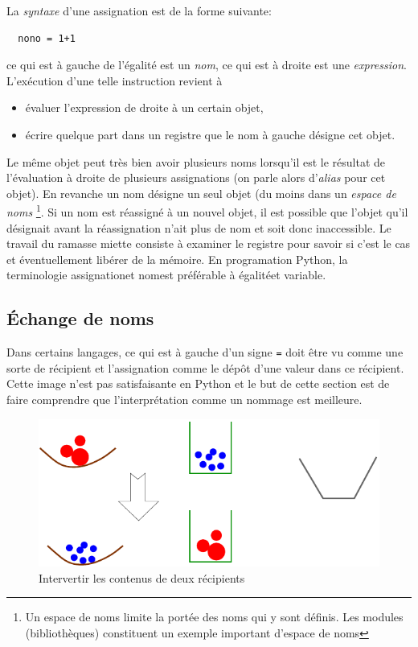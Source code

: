 La \emph{syntaxe} d'une assignation est de la forme suivante:
\begin{verbatim}
  nono = 1+1
\end{verbatim}
ce qui est à gauche de l'égalité est un \emph{nom}, ce qui est à droite est une \emph{expression}. L'exécution d'une telle instruction revient à
\begin{itemize}
  \item évaluer l'expression de droite à un certain objet,
  \item écrire quelque part dans un registre que le nom à gauche désigne cet objet.
\end{itemize}
Le même objet peut très bien avoir plusieurs noms lorsqu'il est le résultat de l'évaluation à droite de plusieurs assignations (on parle alors d'\emph{alias}  pour cet objet). En revanche un nom désigne un seul objet (du moins dans un \emph{espace de noms} \footnote{Un espace de noms limite la portée des noms qui y sont définis. Les modules (bibliothèques) constituent un exemple important d'espace de noms}. Si un nom est réassigné à un nouvel objet, il est possible que l'objet qu'il désignait avant la réassignation n'ait plus de nom et soit donc inaccessible. Le travail du ramasse miette consiste à examiner le registre pour savoir si c'est le cas et éventuellement libérer de la mémoire.\newline 
En programation Python, la terminologie \og assignation\fg et \og nom\fg est préférable à \og égalité\fg et \og variable\fg.

\subsection{\'Echange de noms}
Dans certains langages, ce qui est à gauche d'un signe \texttt{=} doit être vu comme une sorte de récipient et l'assignation comme le dépôt d'une valeur dans ce récipient. Cette image n'est pas satisfaisante en Python et le but de cette section est de faire comprendre que l'interprétation comme un nommage est meilleure.

\begin{figure}[!ht]
 \centering
 \includegraphics{Einterv_1.pdf}
 \caption{Intervertir les contenus de deux récipients}
 \label{fig:Einterv_1}
\end{figure}

